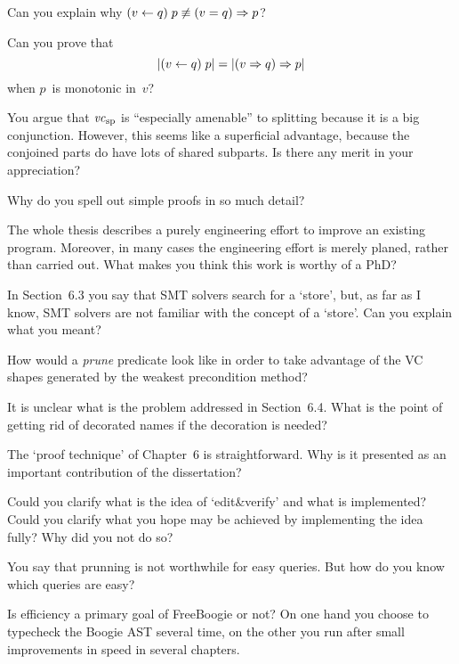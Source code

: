 \Q Can you explain why $(v\gets q)\;p\not\equiv(v=q)\Rightarrow p$?

\Q Can you prove that $$|(v\gets q)\;p|=|(v\Rightarrow q)\Rightarrow p|$$ when $p$~is
monotonic in~$v$?

\Q You argue that ${\it vc}_{\rm sp}$ is ``especially amenable'' to
splitting because it is a big conjunction. However, this seems like a
superficial advantage, because the conjoined parts do have lots of shared
subparts.  Is there any merit in your appreciation?

\Q Why do you spell out simple proofs in so much detail?

\Q The whole thesis describes a purely engineering effort to improve an
existing program. Moreover, in many cases the engineering effort is merely
planed, rather than carried out. What makes you think this work is worthy
of a PhD?

\Q In Section~6.3 you say that SMT solvers search for a `store', but, as
far as I know, SMT solvers are not familiar with the concept of a `store'.
Can you explain what you meant?

\Q How would a {\it prune\/} predicate look like in order to take advantage
of the VC shapes generated by the weakest precondition method?

\Q It is unclear what is the problem addressed in Section~6.4. What is the
point of getting rid of decorated names if the decoration is needed?


\Q The `proof technique' of Chapter~6 is straightforward. Why is it
presented as an important contribution of the dissertation?


\Q Could you clarify what is the idea of `edit\&verify' and what is
implemented? Could you clarify what you hope may be achieved by
implementing the idea fully? Why did you not do so?

\Q You say that prunning is not worthwhile for easy queries. But how do you
know which queries are easy?


\Q Is efficiency a primary goal of FreeBoogie or not? On one hand you choose
to typecheck the Boogie AST several time, on the other you run after small
improvements in speed in several chapters.

